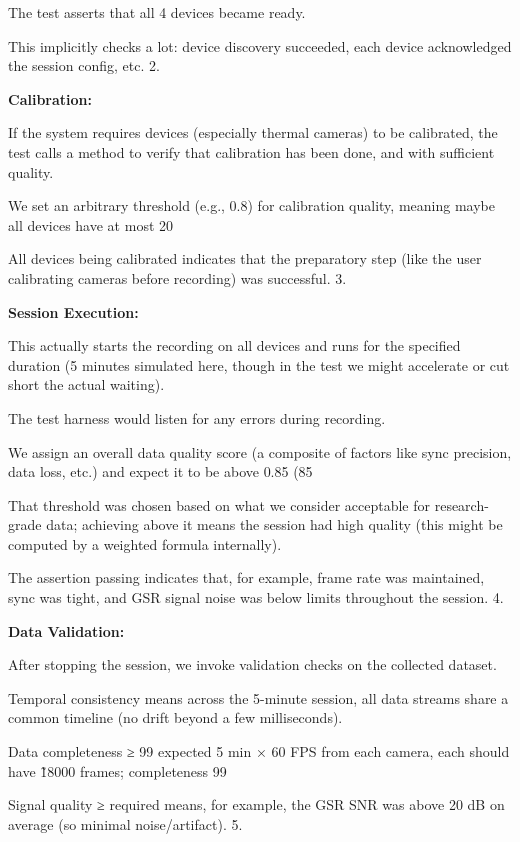 {{The test asserts that all 4 devices became ready.

This implicitly checks a lot: device discovery succeeded, each device
acknowledged the session config, etc. 2.

\textbf{Calibration:}

If the system requires devices (especially thermal cameras) to be calibrated,
the test calls a method to verify that calibration has been done, and with
sufficient quality.

We set an arbitrary threshold (e.g., 0.8) for calibration quality, meaning maybe
all devices have at most 20%

All devices being calibrated indicates that the preparatory step (like the user
calibrating cameras before recording) was successful. 3.

\textbf{Session Execution:}

This actually starts the recording on all devices and runs for the specified
duration (5 minutes simulated here, though in the test we might accelerate or
cut short the actual waiting).

The test harness would listen for any errors during recording.

We assign an overall data quality score (a composite of factors like sync
precision, data loss, etc.) and expect it to be above 0.85 (85%

That threshold was chosen based on what we consider acceptable for
research-grade data; achieving above it means the session had high quality (this
might be computed by a weighted formula internally).

The assertion passing indicates that, for example, frame rate was maintained,
sync was tight, and GSR signal noise was below limits throughout the session. 4.

\textbf{Data Validation:}

After stopping the session, we invoke validation checks on the collected
dataset.

Temporal consistency means across the 5-minute session, all data streams share a
common timeline (no drift beyond a few milliseconds).

Data completeness ≥ 99%
expected 5 min × 60 FPS from each camera, each should have \~18000 frames;
completeness 99%

Signal quality ≥ required means, for example, the GSR SNR was above 20 dB on
average (so minimal noise/artifact). 5.

}}
